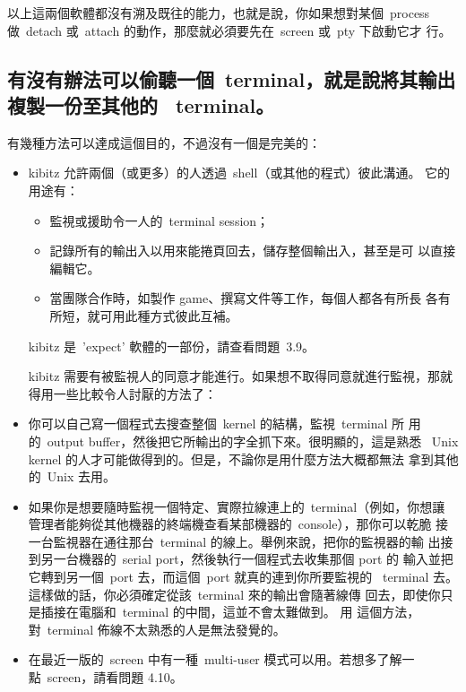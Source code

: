 \documentclass{article}
\begin{document}
\begin{CJK*}{Bg5}{ming}
	以上這兩個軟體都沒有溯及既往的能力，也就是說，你如果想對某個~process
        做~detach 或~attach 的動作，那麼就必須要先在~screen 或~pty 下啟動它才
        行。

\subsection{有沒有辦法可以偷聽一個~terminal，就是說將其輸出複製一份至其他的 
     ~terminal。}

	有幾種方法可以達成這個目的，不過沒有一個是完美的：
\begin{itemize}
	\item  kibitz 允許兩個（或更多）的人透過~shell（或其他的程式）彼此溝通。
           它的用途有：
	   \begin{itemize}
		\item  監視或援助令一人的~terminal session；
		\item  記錄所有的輸出入以用來能捲頁回去，儲存整個輸出入，甚至是可
                   以直接編輯它。
		\item  當團隊合作時，如製作 game、撰寫文件等工作，每個人都各有所長
                   各有所短，就可用此種方式彼此互補。
	   \end{itemize}
	kibitz 是~'expect' 軟體的一部份，請查看問題~3.9。

	kibitz 需要有被監視人的同意才能進行。如果想不取得同意就進行監視，那就
        得用一些比較令人討厭的方法了：

	\item  你可以自己寫一個程式去搜查整個~kernel 的結構，監視~terminal 所
	   用的~output buffer，然後把它所輸出的字全抓下來。很明顯的，這是熟悉
	   ~Unix kernel 的人才可能做得到的。但是，不論你是用什麼方法大概都無法
           拿到其他的~Unix 去用。

	\item 如果你是想要隨時監視一個特定、實際拉線連上的~terminal（例如，你想讓
	   管理者能夠從其他機器的終端機查看某部機器的~console），那你可以乾脆
           接一台監視器在通往那台~terminal 的線上。舉例來說，把你的監視器的輸
           出接到另一台機器的~serial port，然後執行一個程式去收集那個 port 的
           輸入並把它轉到另一個~port 去，而這個~port 就真的連到你所要監視的 
          ~terminal 去。這樣做的話，你必須確定從該~terminal 來的輸出會隨著線傳
           回去，即使你只是插接在電腦和~terminal 的中間，這並不會太難做到。 用
           這個方法，對~terminal 佈線不太熟悉的人是無法發覺的。

	\item  在最近一版的~screen 中有一種~multi-user 模式可以用。若想多了解一
           點~screen，請看問題 4.10。


\end{itemize}
\end{CJK*}
\end{document}
